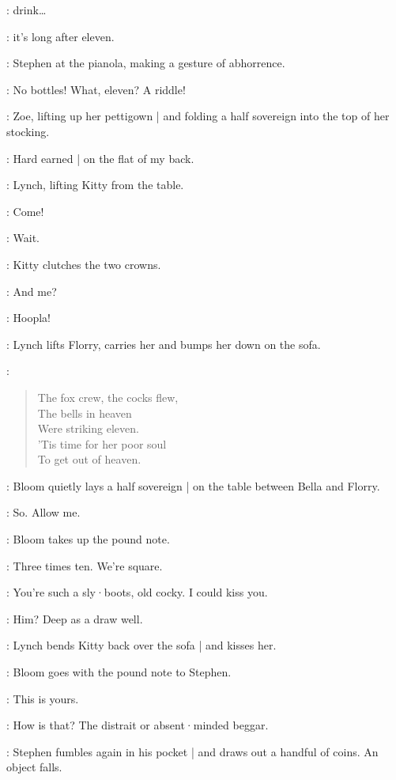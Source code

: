 \Lynch:
drink…

\Bella:
it's long after eleven.

:
Stephen at the pianola,
making a gesture of abhorrence.

\Stephen:
No bottles!
What,
eleven?
A riddle!

:
Zoe,
lifting up her pettigown |
and folding a half sovereign into the top of her stocking.

\Zoe:
Hard earned |
on the flat of my back.

:
Lynch,
lifting Kitty from the table.

\Lynch:
Come!

\Kitty:
Wait.

:
Kitty clutches the two crowns.

\Florry:
And me?

\Lynch:
Hoopla!

:
Lynch lifts Florry,
carries her and bumps her down on the sofa.

\Stephen:
\begin{verse}
    The fox crew, the cocks flew,\\
    The bells in heaven\\
    Were striking eleven.\\
%
    'Tis time for her poor soul\\
    To get out of heaven.
\end{verse}

:
Bloom quietly lays a half sovereign |
on the table between Bella and Florry.

\Bloom:
So.
Allow me.

:
Bloom takes up the pound note.

\Bloom:
Three times ten.
We're square.

\Bella:
You're such a sly·boots,
old cocky.
I could kiss you.

\Zoe:
Him?
Deep as a draw well.

:
Lynch bends Kitty back over the sofa |
and kisses her.

:
Bloom goes with the pound note to Stephen.

\Bloom:
This is yours.

\Stephen:
How is that?
The distrait or absent·minded beggar.

:
Stephen fumbles again in his pocket |
and draws out a handful of coins.
An object falls.

